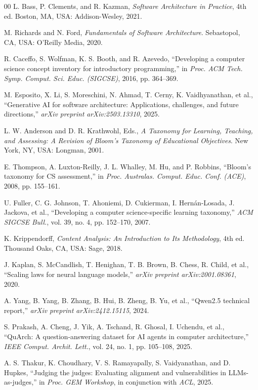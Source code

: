 \documentclass[conference]{IEEEtran}
\begin{document}
\begin{thebibliography}{00}
 L. Bass, P. Clements, and R. Kazman, \textit{Software Architecture in Practice}, 4th ed. Boston, MA, USA: Addison-Wesley, 2021.

 M. Richards and N. Ford, \textit{Fundamentals of Software Architecture}. Sebastopol, CA, USA: O'Reilly Media, 2020.

 R. Caceffo, S. Wolfman, K. S. Booth, and R. Azevedo, ``Developing a computer science concept inventory for introductory programming,'' in \textit{Proc. ACM Tech. Symp. Comput. Sci. Educ. (SIGCSE)}, 2016, pp. 364--369.

 M. Esposito, X. Li, S. Moreschini, N. Ahmad, T. Cerny, K. Vaidhyanathan, et al., ``Generative AI for software architecture: Applications, challenges, and future directions,'' \textit{arXiv preprint arXiv:2503.13310}, 2025.

 L. W. Anderson and D. R. Krathwohl, Eds., \textit{A Taxonomy for Learning, Teaching, and Assessing: A Revision of Bloom's Taxonomy of Educational Objectives}. New York, NY, USA: Longman, 2001.

 E. Thompson, A. Luxton-Reilly, J. L. Whalley, M. Hu, and P. Robbins, ``Bloom's taxonomy for CS assessment,'' in \textit{Proc. Australas. Comput. Educ. Conf. (ACE)}, 2008, pp. 155--161.

 U. Fuller, C. G. Johnson, T. Ahoniemi, D. Cukierman, I. Hern\'{a}n-Losada, J. Jackova, et al., ``Developing a computer science-specific learning taxonomy,'' \textit{ACM SIGCSE Bull.}, vol. 39, no. 4, pp. 152--170, 2007.

 K. Krippendorff, \textit{Content Analysis: An Introduction to Its Methodology}, 4th ed. Thousand Oaks, CA, USA: Sage, 2018.

 J. Kaplan, S. McCandlish, T. Henighan, T. B. Brown, B. Chess, R. Child, et al., ``Scaling laws for neural language models,'' \textit{arXiv preprint arXiv:2001.08361}, 2020.

 A. Yang, B. Yang, B. Zhang, B. Hui, B. Zheng, B. Yu, et al., ``Qwen2.5 technical report,'' \textit{arXiv preprint arXiv:2412.15115}, 2024.

 S. Prakash, A. Cheng, J. Yik, A. Tschand, R. Ghosal, I. Uchendu, et al., ``QuArch: A question-answering dataset for AI agents in computer architecture,'' \textit{IEEE Comput. Archit. Lett.}, vol. 24, no. 1, pp. 105--108, 2025.

 A. S. Thakur, K. Choudhary, V. S. Ramayapally, S. Vaidyanathan, and D. Hupkes, ``Judging the judges: Evaluating alignment and vulnerabilities in LLMs-as-judges,'' in \textit{Proc. GEM Workshop}, in conjunction with \textit{ACL}, 2025.



\end{thebibliography}
\end{document}
